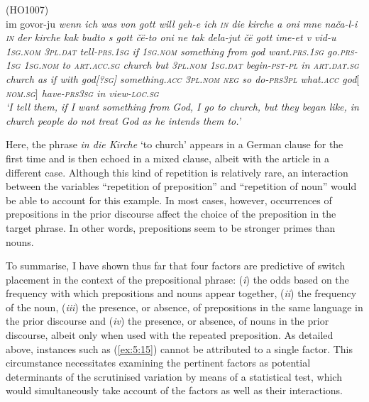 \ea
\label{ex5.16}
(HO1007)\\
 {im} {govor-ju} \itshape{wenn} \itshape{ich} \itshape{was} \itshape{von} \itshape{gott} \itshape{will} \itshape{geh-e} \itshape{ich} \itshape{\textsc{in}} \itshape{die} \itshape{kirche} {a} {oni} {mne} {nača-l-i} \itshape{\textsc{in}} \itshape{der} \itshape{kirche} {kak} {budto} {s} \textit{gott} {čë-to} {oni} {ne} {tak} {dela-jut} {čë} \textit{gott} {ime-et} {v} {vid-u}\\
	{\textsc{1sg.nom}} \textsc{3pl.dat} tell-\textsc{prs.1sg} if \textsc{1sg.nom} something from god want.\textsc{prs.1sg} go.\textsc{prs-1sg} \textsc{1sg.nom} to \textsc{art.acc.sg} church but \textsc{3pl.nom} \textsc{1sg.dat} begin-\textsc{pst-pl} in \textsc{art.dat.sg} church as if with god[\textsc{?sg}] something.\textsc{acc} \textsc{3pl.nom} \textsc{neg} so do-\textsc{prs3pl} what.\textsc{acc} god$[$\textsc{nom.sg}$]$ have-\textsc{prs3sg} in view-\textsc{loc.sg}\\
\glt `I tell them, if I want something from God, I go to church, but they began like, in church people do not treat God as he intends them to.'
\z

\noindent Here, the phrase \textit{in die Kirche} `to church' appears in a German clause for the first time and is then echoed in a mixed clause, albeit with the article in a different case. Although this kind of repetition is relatively rare, an interaction between the variables “repetition of preposition” and “repetition of noun” would be able to account for this example. In most cases, however, occurrences of prepositions in the prior discourse affect the choice of the preposition in the target phrase. In other words, prepositions seem to be stronger primes than nouns.

To summarise, I have shown thus far that four factors are predictive of switch placement in the context of the prepositional phrase: (\textit{i}) the odds based on the frequency with which prepositions and nouns appear together, (\textit{ii}) the frequency of the noun, (\textit{iii}) the presence, or absence, of prepositions in the same language in the prior discourse and (\textit{iv}) the presence, or absence, of nouns in the prior discourse, albeit only when used with the repeated preposition. As detailed above, instances such as (\ref{ex:5:15}) cannot be attributed to a single factor. This circumstance necessitates examining the pertinent factors as potential determinants of the scrutinised variation by means of a statistical test, which would simultaneously take account of the factors as well as their interactions.

